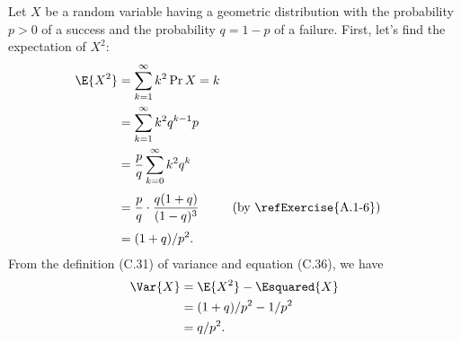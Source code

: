 Let $X$ be a random variable having a geometric distribution with the probability $p>0$ of a success and the probability $q=1-p$ of a failure.
First, let's find the expectation of $X^2$:
\begin{align*}
    \E{X^2} &= \sum_{k=1}^\infty k^2\Pr{X=k} \\
    &= \sum_{k=1}^\infty k^2q^{k-1}p \\
    &= \frac{p}{q}\sum_{k=0}^\infty k^2q^k \\[1mm]
    &= \frac{p}{q}\cdot\frac{q(1+q)}{(1-q)^3} && \text{(by \refExercise{A.1-6})} \\[1mm]
    &= (1+q)/p^2.
\end{align*}
From the definition (C.31) of variance and equation (C.36), we have
\begin{align*}
    \Var{X} &= \E{X^2}-\Esquared{X} \\
    &= (1+q)/p^2-1/p^2 \\
    &= q/p^2.
\end{align*}
